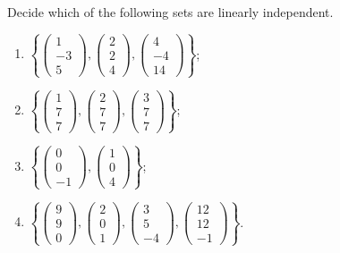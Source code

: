 


\begin{exercise}{}{}
 Decide which of the following sets are linearly independent.
 \begin{enumerate}[label=(\alph*)]
  \item $\left\{ 
   \begin{pmatrix}
    1\\
    -3\\
    5
   \end{pmatrix},
   \begin{pmatrix}
    2\\
    2\\
    4
   \end{pmatrix},
   \begin{pmatrix}
    4\\
    -4\\
    14
   \end{pmatrix}
   \right\}$;
  \item $\left\{ 
   \begin{pmatrix}
    1\\
    7\\
    7
   \end{pmatrix},
   \begin{pmatrix}
    2\\
    7\\
    7
   \end{pmatrix},
   \begin{pmatrix}
    3\\
    7\\
    7
   \end{pmatrix}
   \right\}$;
  \item $\left\{ 
   \begin{pmatrix}
    0\\
    0\\
    -1
   \end{pmatrix},
   \begin{pmatrix}
    1\\
    0\\
    4
   \end{pmatrix}
   \right\}$;
  \item $\left\{ 
   \begin{pmatrix}
    9\\
    9\\
    0
   \end{pmatrix},
   \begin{pmatrix}
    2\\
    0\\
    1
   \end{pmatrix},
   \begin{pmatrix}
    3\\
    5\\
    -4
   \end{pmatrix},
   \begin{pmatrix}
    12\\
    12\\
    -1
   \end{pmatrix}
   \right\}$.
 \end{enumerate}
\end{exercise}
